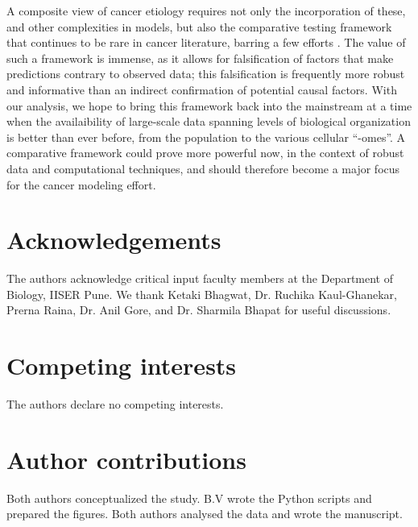 \documentclass[12pt,onecolumn,twoside]{article}
\begin{document}
A composite view of cancer etiology requires not only the incorporation of these, and other complexities in models, but also the comparative testing framework that continues to be rare in cancer literature, barring a few efforts \autocite{Frank2007}. The value of such a framework is immense, as it allows for falsification of factors that make predictions contrary to observed data; this falsification is frequently more robust and informative than an indirect confirmation of potential causal factors. With our analysis, we hope to bring this framework back into the mainstream at a time when the availaibility of large-scale data spanning levels of biological organization is better than ever before, from the population to the various cellular ``-omes''. A comparative framework could prove more powerful now, in the context of robust data and computational techniques, and should therefore become a major focus for the cancer modeling effort.

\section*{Acknowledgements}
The authors acknowledge critical input faculty members at the Department of Biology, IISER Pune. We thank Ketaki Bhagwat, Dr. Ruchika Kaul-Ghanekar, Prerna Raina, Dr. Anil Gore, and Dr. Sharmila Bhapat for useful discussions.

\section*{Competing interests}
The authors declare no competing interests.

\section*{Author contributions}
Both authors conceptualized the study. B.V wrote the Python scripts and prepared the figures. Both authors analysed the data and wrote the manuscript.

\printbibliography
\end{document}
